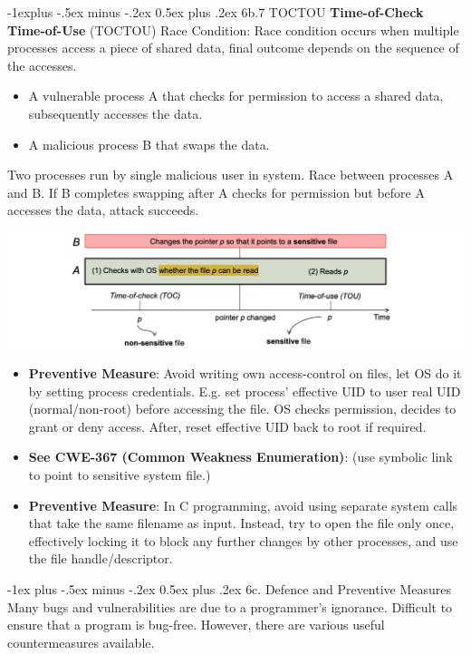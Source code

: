\documentclass[10pt, landscape]{article}
\makeatletter
\renewcommand{\section}{\@startsection{section}{1}{0mm}%
                                {-1ex plus -.5ex minus -.2ex}%
                                {0.5ex plus .2ex}%
                                {\normalfont\large\bfseries}}
\renewcommand{\subsection}{\@startsection{subsection}{2}{0mm}%
                                {-1explus -.5ex minus -.2ex}%
                                {0.5ex plus .2ex}%
                                {\normalfont\normalsize\bfseries}}
\makeatother
\begin{document}
\begin{multicols*}{3}
\subsection{6b.7 TOCTOU}
\textbf{Time-of-Check Time-of-Use} (TOCTOU) Race Condition: Race condition occurs when multiple processes access a piece of shared data, final outcome depends on the sequence of the accesses.
\begin{itemize}
\item A vulnerable process A that checks for permission to access a shared data, subsequently accesses the data.
\item A malicious process B that swaps the data.
\end{itemize}
Two processes run by single malicious user in system. Race between processes A and B. If B completes swapping after A checks for permission but before A accesses the data, attack succeeds.
\centerline{\includegraphics[width=0.8\linewidth]{TOCTOU}}
\begin{itemize}
\item \textbf{Preventive Measure}: Avoid writing own access-control on files, let OS do it by setting process credentials. E.g. set process’ effective UID to user real UID (normal/non-root) before accessing the file. OS checks permission, decides to grant or deny access. After, reset effective UID back to root if required.
\item \textbf{See CWE-367 (Common Weakness Enumeration)}: (use symbolic link to point to sensitive system file.)
\item \textbf{Preventive Measure}: In C programming, avoid using separate system calls that take the same filename as input. 
Instead, try to open the file only once, effectively locking it to block any further changes by other processes, and use the file handle/descriptor. 
\end{itemize}



\section{6c. Defence and Preventive Measures}
Many bugs and vulnerabilities are due to a programmer’s ignorance. Difficult to ensure that a program is bug-free. However, there are various useful countermeasures available.


\end{multicols*}
\end{document}
